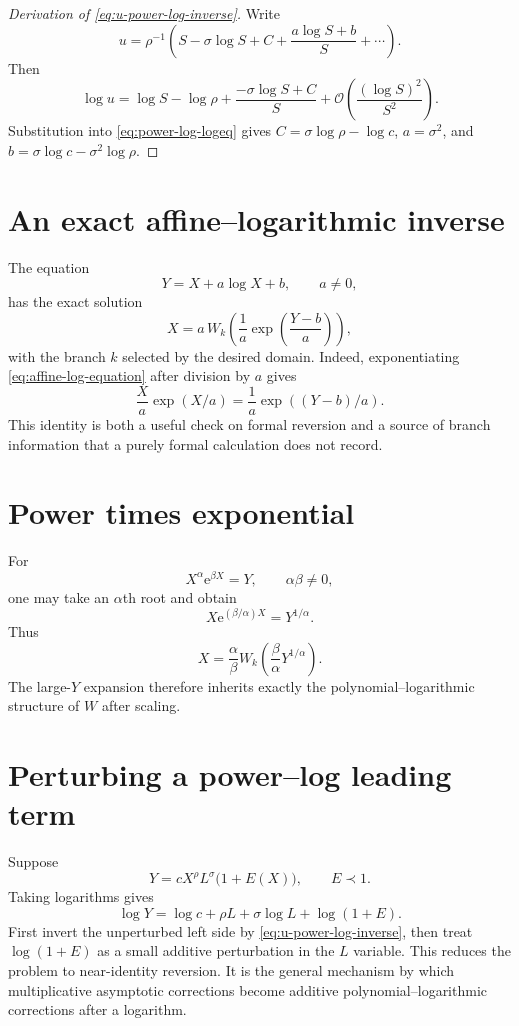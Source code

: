 \documentclass[11pt,oneside]{book}
\theoremstyle{definition}
\theoremstyle{remark}
\newcommand{\e}{\mathrm e}
\newcommand{\bigO}{\mathcal O}
\newcommand{\precdom}{\prec}
\begin{document}
\begin{proof}[Derivation of \eqref{eq:u-power-log-inverse}]
Write
\[
 u=\rho^{-1}\left(S-\sigma\log S+C+\frac{a\log S+b}{S}+\cdots\right).
\]
Then
\[
 \log u=\log S-\log\rho
 +\frac{-\sigma\log S+C}{S}
 +\bigO\left(\frac{(\log S)^2}{S^2}\right).
\]
Substitution into \eqref{eq:power-log-logeq} gives
$C=\sigma\log\rho-\log c$, $a=\sigma^2$, and
$b=\sigma\log c-\sigma^2\log\rho$.
\end{proof}

\section{An exact affine--logarithmic inverse}
The equation
\begin{equation}\label{eq:affine-log-equation}
 Y=X+a\log X+b,
 \qquad a\ne0,
\end{equation}
has the exact solution
\begin{equation}\label{eq:affine-log-W}
 X=a\,W_k\!\left(\frac1a
 \exp\!\left(\frac{Y-b}{a}\right)\right),
\end{equation}
with the branch $k$ selected by the desired domain.  Indeed, exponentiating
\eqref{eq:affine-log-equation} after division by $a$ gives
\[
 \frac Xa\exp(X/a)=\frac1a\exp((Y-b)/a).
\]
This identity is both a useful check on formal reversion and a source of
branch information that a purely formal calculation does not record.

\section{Power times exponential}
For
\begin{equation}\label{eq:power-exp-equation}
 X^\alpha\e^{\beta X}=Y,
 \qquad \alpha\beta\ne0,
\end{equation}
one may take an $\alpha$th root and obtain
\[
 X\e^{(\beta/\alpha)X}=Y^{1/\alpha}.
\]
Thus
\begin{equation}\label{eq:power-exp-W}
 X=\frac{\alpha}{\beta}
 W_k\!\left(\frac{\beta}{\alpha}Y^{1/\alpha}\right).
\end{equation}
The large-$Y$ expansion therefore inherits exactly the
polynomial--logarithmic structure of $W$ after scaling.

\section{Perturbing a power--log leading term}
Suppose
\begin{equation}\label{eq:perturbed-power-log}
 Y=cX^\rho L^\sigma\bigl(1+E(X)\bigr),
 \qquad E\precdom1.
\end{equation}
Taking logarithms gives
\[
 \log Y=\log c+\rho L+\sigma\log L+\log(1+E).
\]
First invert the unperturbed left side by \eqref{eq:u-power-log-inverse}, then
treat $\log(1+E)$ as a small additive perturbation in the $L$ variable.
This reduces the problem to near-identity reversion.  It is the general
mechanism by which multiplicative asymptotic corrections become additive
polynomial--logarithmic corrections after a logarithm.
\end{document}
